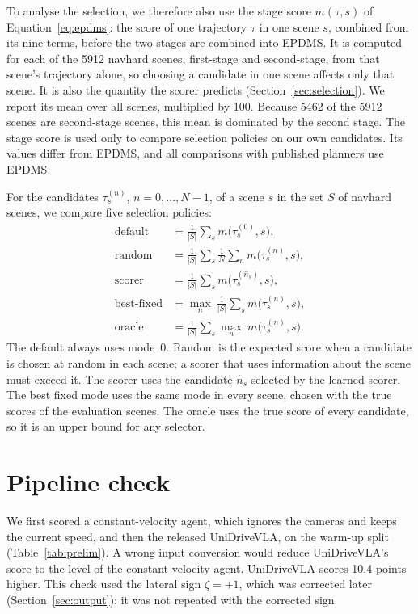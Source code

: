 \documentclass[11pt, a4paper, oneside]{book}
\begin{document}
To analyse the selection, we therefore also use the stage score $m(\tau,s)$ of
Equation~\eqref{eq:epdms}: the score of one trajectory $\tau$ in one scene $s$, combined from
its nine terms, before the two stages are combined into EPDMS. It is computed for each of the
\num{5912} navhard scenes, first-stage and second-stage, from that scene's trajectory alone, so
choosing a candidate in one scene affects only that scene. It is also the quantity the scorer predicts
(Section~\ref{sec:selection}). We report its mean over all scenes, multiplied by 100. Because
\num{5462} of the \num{5912} scenes are second-stage scenes, this mean is dominated by the
second stage. The stage score is used only to compare selection policies on our own
candidates. Its values differ from
EPDMS, and all comparisons with published planners use EPDMS.

For the candidates $\tau^{(n)}_s$, $n=0,\dots,N-1$, of a
scene $s$ in the set $S$ of navhard scenes, we compare five selection policies:
\begin{align}
  \mathrm{default}    &= \tfrac{1}{|S|}\textstyle\sum_{s} m\big(\tau^{(0)}_s,s\big), \\
  \mathrm{random}     &= \tfrac{1}{|S|}\textstyle\sum_{s} \tfrac{1}{N}\sum_{n} m\big(\tau^{(n)}_s,s\big), \\
  \mathrm{scorer}     &= \tfrac{1}{|S|}\textstyle\sum_{s} m\big(\tau^{(\hat n_s)}_s,s\big), \\
  \mathrm{best\text{-}fixed} &= \max_{n}\ \tfrac{1}{|S|}\textstyle\sum_{s} m\big(\tau^{(n)}_s,s\big), \\
  \mathrm{oracle}     &= \tfrac{1}{|S|}\textstyle\sum_{s} \max_{n}\ m\big(\tau^{(n)}_s,s\big).
\end{align}
The default always uses mode~0. Random is the expected score when a candidate is chosen at
random in each scene; a scorer that uses information about the scene must exceed it. The scorer
uses the candidate $\hat n_s$ selected by the learned scorer. The best fixed mode uses the same
mode in every scene, chosen with the true scores of the evaluation scenes. The oracle uses the
true score of every candidate, so it is an upper bound for any selector.

\section{Pipeline check}
\label{sec:zeroshot}
We first scored a constant-velocity agent, which ignores the cameras and keeps the current
speed, and then the released UniDriveVLA, on the warm-up split (Table~\ref{tab:prelim}). A wrong
input conversion would reduce UniDriveVLA's score to the level of the constant-velocity agent.
UniDriveVLA scores 10.4 points higher. This check used the lateral sign $\zeta=+1$, which was
corrected later (Section~\ref{sec:output}); it was not repeated with the corrected sign.
\end{document}
